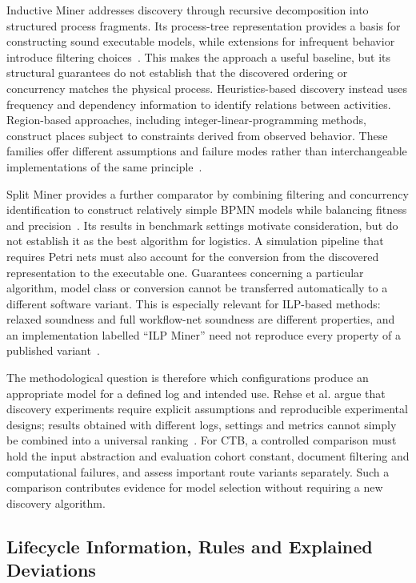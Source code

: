 Inductive Miner addresses discovery through recursive decomposition into structured process fragments. Its process-tree representation provides a basis for constructing sound executable models, while extensions for infrequent behavior introduce filtering choices~\cite{Leemans2014InductiveMiner}. This makes the approach a useful baseline, but its structural guarantees do not establish that the discovered ordering or concurrency matches the physical process. Heuristics-based discovery instead uses frequency and dependency information to identify relations between activities. Region-based approaches, including integer-linear-programming methods, construct places subject to constraints derived from observed behavior. These families offer different assumptions and failure modes rather than interchangeable implementations of the same principle~\cite{RWAugusto2019Review,RWVanZelst2018ILP}.

Split Miner provides a further comparator by combining filtering and concurrency identification to construct relatively simple BPMN models while balancing fitness and precision~\cite{RWSplitMiner2019}. Its results in benchmark settings motivate consideration, but do not establish it as the best algorithm for logistics. A simulation pipeline that requires Petri nets must also account for the conversion from the discovered representation to the executable one. Guarantees concerning a particular algorithm, model class or conversion cannot be transferred automatically to a different software variant. This is especially relevant for ILP-based methods: relaxed soundness and full workflow-net soundness are different properties, and an implementation labelled ``ILP Miner'' need not reproduce every property of a published variant~\cite{RWVanZelst2018ILP}.

The methodological question is therefore which configurations produce an appropriate model for a defined log and intended use. Rehse et al. argue that discovery experiments require explicit assumptions and reproducible experimental designs; results obtained with different logs, settings and metrics cannot simply be combined into a universal ranking~\cite{RWRehse2024Experimentation}. For CTB, a controlled comparison must hold the input abstraction and evaluation cohort constant, document filtering and computational failures, and assess important route variants separately. Such a comparison contributes evidence for model selection without requiring a new discovery algorithm.

\subsection{Lifecycle Information, Rules and Explained Deviations}

